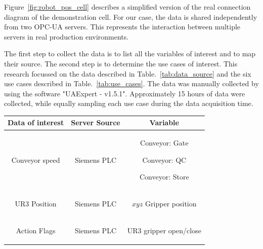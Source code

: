 \documentclass[5p,times,procedia]{elsarticle}
\begin{document}
Figure~\ref{fig:robot_pos_cell} describes a simplified version of the real connection diagram of the demonstration cell. For our case, the data is shared independently from two OPC-UA servers. This represents the interaction between multiple servers in real production environments. 

The first step to collect the data is to list all the variables of interest and to map their source. The second step is to determine the use cases of interest.  This research focussed on the data described in Table.~\ref{tab:data_source} and the six use cases described in Table.~\ref{tab:use_cases}. The data was manually collected by using the software "UAExpert - v1.5.1". Approximately 15 hours of data were collected, while equally sampling each use case during the data acquisition time.

\begin{table}
       \centering
       \begin{adjustbox}{width=.45\textwidth}
       \begin{tabular}{ c c c } \toprule
              \textbf{Data of interest} & \textbf{Server Source} & \textbf{Variable}\\ \midrule
              Conveyor speed       & Siemens PLC       & \begin{minipage}[t]{0.2\textwidth}
              \begin{description}
                     \item Conveyor: Gate
                     \item Conveyor: QC
                     \item Conveyor: Store
                     \end{description}
                     \end{minipage} \\ \hline
              UR3 Position         & Siemens PLC       & \begin{minipage}[t]{0.2\textwidth}
              \begin{description}
                     \item $xyz$ Gripper position
                     \end{description}
                     \end{minipage} \\ \hline
              Action Flags         & Siemens PLC       & \begin{minipage}[t]{0.2\textwidth}
              \begin{description}
                     \item UR3 gripper open/close

\end{description}
\end{minipage}
\end{tabular}
\end{adjustbox}
\end{table}
\end{document}
